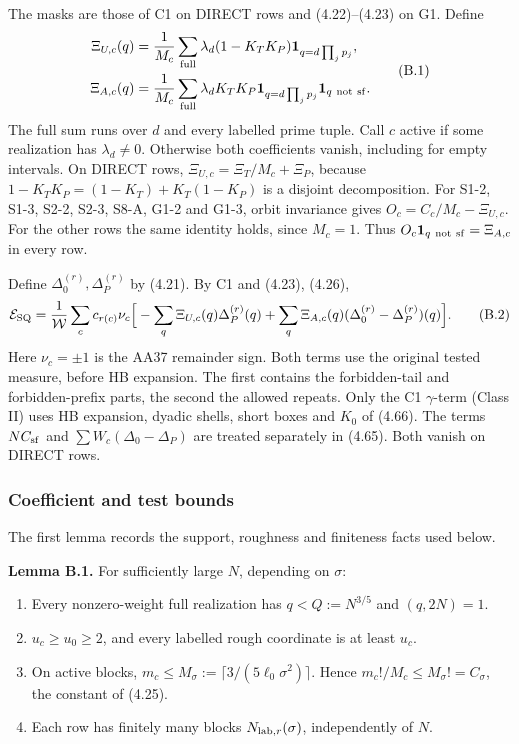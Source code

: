 The masks are those of C1 on DIRECT rows and (4.22)--(4.23) on G1.
Define
\begingroup\small
\[
\begin{aligned}
 \Xi_{U,c}(q)&=\frac1{M_c}\sum_{\rm full}\lambda_d(1-K_TK_P)
              \mathbf1_{q=d\prod_jp_j},\\
 \Xi_{A,c}(q)&=\frac1{M_c}\sum_{\rm full}\lambda_dK_TK_P
              \mathbf1_{q=d\prod_jp_j}\mathbf1_{q\ \rm not\ sf}.
\end{aligned}
 \tag{B.1}
\]
\endgroup
The full sum runs over $d$ and every labelled prime tuple.
Call $c$ active if some realization has $\lambda_d\ne0$.
Otherwise both coefficients vanish, including for empty intervals.
On DIRECT rows, $\Xi_{U,c}=\Xi_T/M_c+\Xi_P$, because
$1-K_TK_P=(1-K_T)+K_T(1-K_P)$ is a disjoint decomposition.
For S1-2, S1-3, S2-2, S2-3, S8-A, G1-2 and G1-3,
orbit invariance gives $O_c=C_c/M_c-\Xi_{U,c}$.
For the other rows the same identity holds, since $M_c=1$.
Thus $O_c\mathbf1_{q\ \rm not\ sf}=\Xi_{A,c}$ in every row.

Define $\Delta_0^{(r)},\Delta_P^{(r)}$ by (4.21).
By C1 and (4.23), (4.26),
\[
 \mathcal E_{\rm SQ}
 =\frac1{\mathcal W}\sum_c c_{r(c)}\nu_c
  \Big[-\sum_q\Xi_{U,c}(q)\Delta_P^{(r)}(q)
       +\sum_q\Xi_{A,c}(q)(\Delta_0^{(r)}-\Delta_P^{(r)})(q)\Big].
 \tag{B.2}
\]
Here $\nu_c=\pm1$ is the AA37 remainder sign.
Both terms use the original tested measure, before HB expansion.
The first contains the forbidden-tail and forbidden-prefix parts,
the second the allowed repeats.
Only the C1 $\gamma$-term (Class II) uses HB expansion,
dyadic shells, short boxes and $K_0$ of (4.66).
The terms $NC_{\rm sf}$ and $\sum W_c(\Delta_0-\Delta_P)$ are treated separately in (4.65).
Both vanish on DIRECT rows.

\subsubsection*{Coefficient and test bounds}

The first lemma records the support, roughness and finiteness facts used below.

\textbf{Lemma B.1.} For sufficiently large $N$, depending on $\sigma$:
\begin{enumerate}
\item Every nonzero-weight full realization has $q<Q:=N^{3/5}$ and $(q,2N)=1$.
\item $u_c\ge u_0\ge2$, and every labelled rough coordinate is at least $u_c$.
\item On active blocks,
$m_c\le M_\sigma:=\lceil3/(5\ell_0\sigma^2)\rceil$.
Hence $m_c!/M_c\le M_\sigma!=C_\sigma$, the constant of (4.25).
\item Each row has finitely many blocks $N_{{\rm lab},r}(\sigma)$, independently of $N$.
\end{enumerate}


